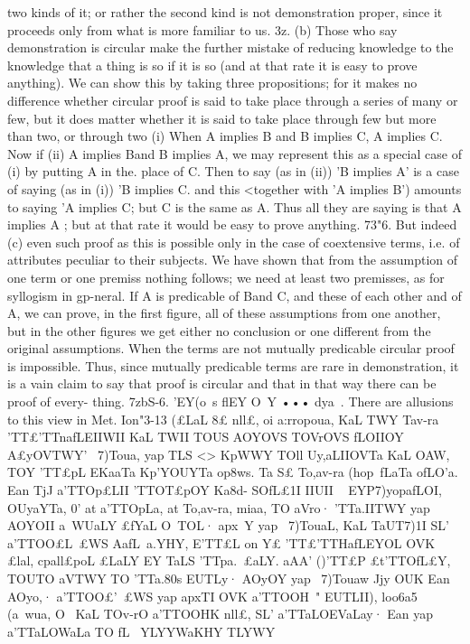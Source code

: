 {two kinds of it; or rather the second kind is not demonstration
proper, since it proceeds only from what is more familiar to us.
3z. (b) Those who say demonstration is circular make the
further mistake of reducing knowledge to the knowledge that a
thing is so if it is so (and at that rate it is easy to prove anything).
We can show this by taking three propositions; for it makes no
difference whether circular proof is said to take place through
a series of many or few, but it does matter whether it is said to
take place through few but more than two, or through two
(i) When A implies B and B implies C, A implies C. Now if
(ii) A implies Band B implies A, we may represent this as a
special case of (i) by putting A in the. place of C. Then to say (as
in (ii)) 'B implies A' is a case of saying (as in (i)) 'B implies C.
and this <together with 'A implies B') amounts to saying
'A implies C; but C is the same as A. Thus all they are saying
is that A implies A ; but at that rate it would be easy to prove
anything.
73"6. But indeed (c) even such proof as this is possible only in
the case of coextensive terms, i.e. of attributes peculiar to their
subjects. We have shown that from the assumption of one term
or one premiss nothing follows; we need at least two premisses,
as for syllogism in gp-neral. If A is predicable of Band C, and
these of each other and of A, we can prove, in the first figure, all
of these assumptions from one another, but in the other figures
we get either no conclusion or one different from the original
assumptions. When the terms are not mutually predicable
circular proof is impossible. Thus, since mutually predicable
terms are rare in demonstration, it is a vain claim to say that
proof is circular and that in that way there can be proof of every-
thing.
7zbS-6. 'EY(o~s flEY O~Y ••• dya~. There are allusions to this
view in Met. Ion"3-13 (£LaL 8£ nll£, oi a:rropoua, KaL TWY Tav-ra
'TT£'TTnafLEIIWII KaL TWII TOUS AOYOVS TOVrOVS fLOIIOY A£yOVTWY' ~7)Toua,
yap TLS <> KpWWY TOll Uy,aLIIOVTa KaL OAW, TOY 'TT£pL EKaaTa Kp'YOUYTa
op8ws. Ta S£ To,av-ra (hop~fLaTa ofLO'a. Ean T{jJ a'TTOp£LII 'TTOT£pOY Ka8d-
SOfL£1I IIUII ~ EYP7)yopafLOI, OUyaYTa, 0' at a'TTOpLa, at To,av-ra, miaa, TO
aVro· 'TTa.IITWY yap AOYOII a~WUaLY £fYaL O~TOL· apx~Y yap ~7)TouaL, KaL
TaUT7)1I SL' a'TTOO£L~£WS AafL~a.YHY, E'TT£L on Y£ 'TT£'TTHafLEYOL OVK £lal,
cpall£poL £LaLY EY TaLS 'TTpa.~£aLY. aAA' ()'TT£P £t'TTOfL£Y, TOUTO aVTWY TO
'TTa.80s EUTLy· AOyOY yap ~7)Touaw Jjy OUK Ean AOyo,· a'TTOO£'~£WS yap
apxTI OVK a'TTOOH~" EUTLII), loo6a5~ (a~wua, O~ KaL TOv-rO a'TTOOHK\lWaL
nll£, SL' a'TTaLOEVaLay· Ean yap a'TTaLOWaLa TO fL~ YLYYWaKHY TLYWY
}}
